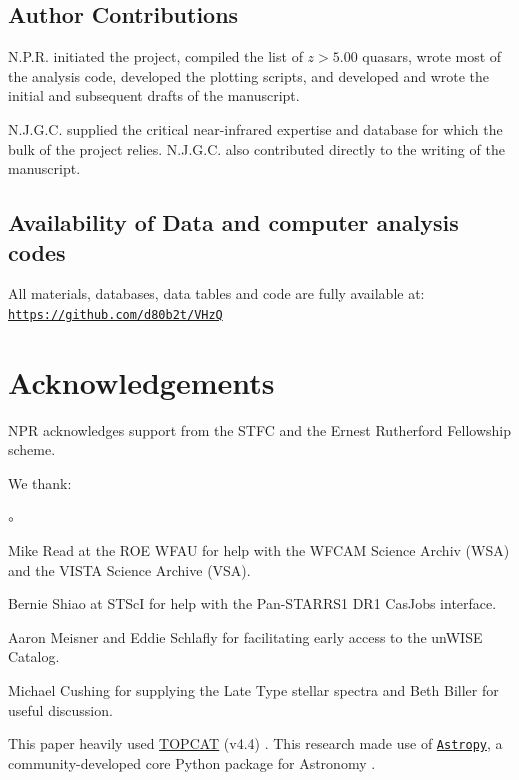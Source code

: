\documentclass[usenatbib]{mnras}
\begin{document}
\subsection*{Author Contributions}   
N.P.R. initiated the project, compiled the list of $z>5.00$ quasars, wrote most of the analysis code, developed the plotting scripts, and developed and wrote the initial and subsequent drafts of the manuscript.

N.J.G.C. supplied the critical near-infrared expertise and database for which the bulk of the project relies. N.J.G.C. also contributed directly to the writing of the manuscript.



\subsection*{Availability of Data and computer analysis codes} 
All materials, databases, data tables and code are fully available at: 
\href{https://github.com/d80b2t/VHzQ}{\tt https://github.com/d80b2t/VHzQ}


\section*{Acknowledgements}
NPR acknowledges support from the STFC and the Ernest Rutherford Fellowship scheme. 

We thank:
\begin{list}{$\circ$}{}  
\item Mike Read at the ROE WFAU for help with the WFCAM Science Archiv (WSA) and the VISTA Science Archive (VSA). 
\item Bernie Shiao at STScI for help with the Pan-STARRS1 DR1 CasJobs interface. 
\item Aaron Meisner and Eddie Schlafly for facilitating early access to the unWISE Catalog. 
\item Michael Cushing for supplying the Late Type stellar spectra and Beth Biller for useful discussion. 
\end{list}


This paper heavily used \href{http://www.star.bris.ac.uk/~mbt/topcat/}{TOPCAT} (v4.4)
\citep[][]{Taylor2005, Taylor2011}.
This research made use of \href{http://www.astropy.org}{\tt Astropy}, 
a community-developed core Python package for Astronomy 
\citep{AstropyCollaboration2013, AstropyCollaboration2018}. 
\end{document}
